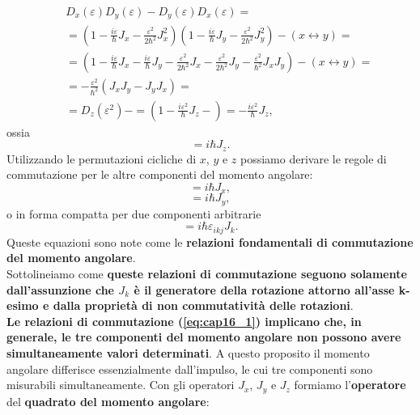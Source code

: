 \documentclass[a4paper,12pt,oneside]{book}
\begin{document}
\begin{eqnarray}
& &D_x (\varepsilon)D_y (\varepsilon)-D_y (\varepsilon)D_x (\varepsilon)= \nonumber\\
& & = \left(1-\frac{i\varepsilon}{\hbar} J_x -\frac{\varepsilon ^2}{2\hbar ^2}J_x ^2\right)\left(1-\frac{i\varepsilon}{\hbar} J_y -\frac{\varepsilon ^2}{2\hbar ^2}J_y ^2\right)- \left( x \leftrightarrow y\right) =\nonumber \\
& &= \left(1-\frac{i\varepsilon}{\hbar} J_x-\frac{i\varepsilon}{\hbar} J_y-\frac{\varepsilon ^2}{2\hbar ^2}J_x-\frac{\varepsilon ^2}{2\hbar ^2}J_y-\frac{\varepsilon ^2}{\hbar ^2}J_xJ_y \right) - \left( x \leftrightarrow y\right) = \nonumber \\
& & = -\frac{\varepsilon ^2}{\hbar ^2}\left(J_xJ_y-J_y J_x\right)= \nonumber \\
& & = D_z (\varepsilon ^2)- = \left(1-\frac{i\varepsilon ^2}{\hbar} J_z-\right)=-\frac{i\varepsilon ^2}{\hbar} J_z, 
\end{eqnarray}
ossia
\begin{equation}
[ J_x, J_y ] = i\hbar J_z.
\end{equation}
Utilizzando le permutazioni cicliche di $x$, $y$ e $z$ possiamo derivare le regole di commutazione per le altre componenti del momento angolare:
\begin{equation}
[ J_y, J_z ] = i\hbar J_x,
\end{equation}
\begin{equation}
[ J_z, J_x ] = i\hbar J_y,
\end{equation}
o in forma compatta per due componenti arbitrarie
\begin{equation}
[ J_i, J_j ] = i\hbar \varepsilon _{ikj}J_k.
\label{eq:cap16_1}
\end{equation}
Queste equazioni sono note come le \textbf{relazioni fondamentali di commutazione del momento angolare}.\\
Sottolineiamo come \textbf{queste relazioni di commutazione seguono solamente dall'assunzione che $J_k$ è il generatore della rotazione attorno all'asse k-esimo e dalla proprietà di non commutatività delle rotazioni}.\\
\textbf{Le relazioni di commutazione (\ref{eq:cap16_1}) implicano che, in generale, le tre componenti del momento angolare non possono avere simultaneamente valori determinati}. A questo proposito il momento angolare differisce essenzialmente dall'impulso, le cui tre componenti sono misurabili simultaneamente.		
Con gli operatori $J_x$, $J_y$ e $J_z$ formiamo l'\textbf{operatore} del \textbf{quadrato del momento angolare}:
\end{document}

